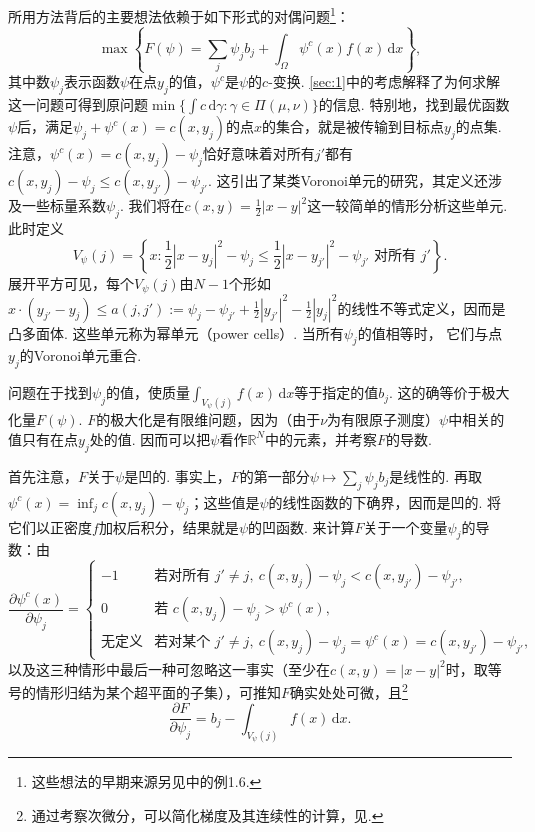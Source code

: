 所用方法背后的主要想法依赖于如下形式的对偶问题\footnote{这些想法的早期来源另见\cite{b176}中的例1.6.}：
\[
\max\left\{F(\psi)=\sum_j\psi_jb_j+
\int_\Omega\psi^c(x)f(x)\,\mathrm dx\right\},
\]
其中数$\psi_j$表示函数$\psi$在点$y_j$的值，$\psi^c$是$\psi$的$c$-变换. \autoref{sec:1}中的考虑解释了为何求解这一问题可得到原问题$\min\{\int c\,\mathrm d\gamma:\gamma\in\Pi(\mu,\nu)\}$的信息. 特别地，找到最优函数$\psi$后，满足$\psi_j+\psi^c(x)=c(x,y_j)$的点$x$的集合，就是被传输到目标点$y_j$的点集. 注意，$\psi^c(x)=c(x,y_j)-\psi_j$恰好意味着对所有$j'$都有$c(x,y_j)-\psi_j\le c(x,y_{j'})-\psi_{j'}$. 这引出了某类Voronoi单元的研究，其定义还涉及一些标量系数$\psi_j$. 我们将在$c(x,y)=\frac12|x-y|^2$这一较简单的情形分析这些单元. 此时定义
\[
V_\psi(j)=\left\{x:\frac12|x-y_j|^2-\psi_j
\le\frac12|x-y_{j'}|^2-\psi_{j'}\text{ 对所有 }j'\right\}.
\]
展开平方可见，每个$V_\psi(j)$由$N-1$个形如$x\cdot(y_{j'}-y_j)\le a(j,j'):=\psi_j-\psi_{j'}+\frac12|y_{j'}|^2-\frac12|y_j|^2$的线性不等式定义，因而是凸多面体. \label{idx:i117-p242}
这些单元称为幂单元（power cells）. 当所有$\psi_j$的值相等时，\label{idx:i158-p242}
它们与点$y_j$的Voronoi单元重合.

问题在于找到$\psi_j$的值，使质量$\int_{V_\psi(j)}f(x)\,\mathrm dx$等于指定的值$b_j$. 这的确等价于极大化量$F(\psi)$. $F$的极大化是有限维问题，因为（由于$\nu$为有限原子测度）$\psi$中相关的值只有在点$y_j$处的值. 因而可以把$\psi$看作$\mathbb R^N$中的元素，并考察$F$的导数.

首先注意，$F$关于$\psi$是凹的. 事实上，$F$的第一部分$\psi\mapsto\sum_j\psi_jb_j$是线性的. 再取$\psi^c(x)=\inf_j c(x,y_j)-\psi_j$；这些值是$\psi$的线性函数的下确界，因而是凹的. 将它们以正密度$f$加权后积分，结果就是$\psi$的凹函数. 来计算$F$关于一个变量$\psi_j$的导数：由
\[
\frac{\partial\psi^c(x)}{\partial\psi_j}=
\begin{cases}
-1&\text{若对所有 }j'\ne j,\ c(x,y_j)-\psi_j<c(x,y_{j'})-\psi_{j'},\\
0&\text{若 }c(x,y_j)-\psi_j>\psi^c(x),\\
\text{无定义}&\text{若对某个 }j'\ne j,\
c(x,y_j)-\psi_j=\psi^c(x)=c(x,y_{j'})-\psi_{j'},
\end{cases}
\]
以及这三种情形中最后一种可忽略这一事实（至少在$c(x,y)=|x-y|^2$时，取等号的情形归结为某个超平面的子集），可推知$F$确实处处可微，且\footnote{通过考察次微分，可以简化梯度及其连续性的计算，见\cite{b24}.}
\[
\frac{\partial F}{\partial\psi_j}
=b_j-\int_{V_\psi(j)}f(x)\,\mathrm dx.
\]


